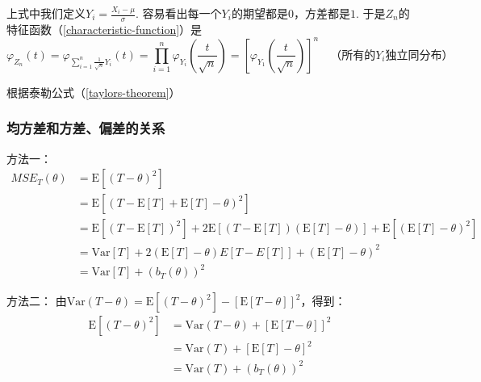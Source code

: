 \documentclass[UTF8]{ctexbook}
\begin{document}
上式中我们定义$Y_i=\frac{X_i-\mu}{\sigma}$. 容易看出每一个$Y_i$的期望都是$0$，方差都是$1$. 于是$Z_n$的特征函数（\ref{characteristic-function}）是
\[
	\varphi_{Z_n}(t)=\varphi_{\sum_{i=1}^n\frac{1}{\sqrt n}Y_i}(t)=\prod_{i=1}^n\varphi_{Y_i}\left(\frac{t}{\sqrt n}\right)=\left[\varphi_{Y_1}\left(\frac{t}{\sqrt n}\right)\right]^n\quad\text{（所有的$Y_i$独立同分布）}
\]

根据泰勒公式（\ref{taylors-theorem}）
\subsubsection{均方差和方差、偏差的关系}
\label{proof1}
方法一：
\begin{align*}
	MSE_T(\theta)&=\mathrm{E}[(T-\theta)^2] \\
	&=\mathrm{E}[(T-\mathrm{E}[T]+\mathrm{E}[T]-\theta)^2]\\
	&=\mathrm{E}[(T-\mathrm{E}[T])^2]+2\mathrm{E}[(T-\mathrm{E}[T])(\mathrm{E}[T]-\theta)]+\mathrm{E}[(\mathrm{E}[T]-\theta)^2]\\
	&=\mathrm{Var}[T]+2(\mathrm{E}[T]-\theta)E[T-E[T]]+(\mathrm{E}[T]-\theta)^2\\
	&=\mathrm{Var}[T]+(b_T(\theta))^2
\end{align*}

方法二：
由$\mathrm{Var}(T-\theta)=\mathrm{E}[(T-\theta)^2]-[\mathrm{E}[T-\theta]]^2$，得到：
\begin{align*}
	\mathrm{E}[(T-\theta)^2]&=\mathrm{Var}(T-\theta)+[\mathrm{E}[T-\theta]]^2\\
	&=\mathrm{Var}(T)+[\mathrm{E}[T]-\theta]^2\\
	&=\mathrm{Var}(T)+(b_T(\theta))^2
\end{align*}
\end{document}
